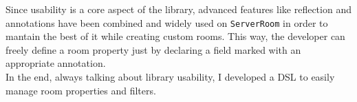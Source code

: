 Since usability is a core aspect of the library, advanced features like reflection and annotations have been combined and widely used on \texttt{ServerRoom} in order to mantain the best of it while creating custom rooms. This way, the developer can freely define a room property just by declaring a field marked with an appropriate annotation.
\\
In the end, always talking about library usability, I developed a DSL to easily manage room properties and filters.





